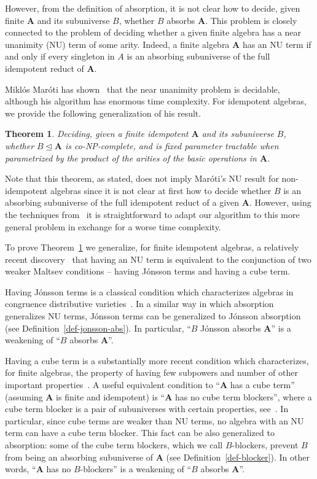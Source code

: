 \documentclass{amsart}
\theoremstyle{plain}
\newtheorem{theorem}{Theorem}
\theoremstyle{definition}
\begin{document}
However, from the definition of absorption, it is not clear how to decide,
given finite ${{\mathbf{A}}}$ and its subuniverse $B$, whether $B$ absorbs ${{\mathbf{A}}}$. This problem is closely connected to the problem of deciding whether a given finite algebra has a near unanimity (NU) term of some arity. Indeed, a finite 
algebra ${{\mathbf{A}}}$ has an NU term if and only if every singleton
in $A$ is an absorbing subuniverse of the full idempotent reduct of ${{\mathbf{A}}}$. 

Mikl\'os Mar\'oti has shown~\cite{maroti-nu-is-decidable} that the near unanimity problem is decidable, although his algorithm has enormous time complexity. 
 For idempotent algebras, we provide the following generalization of his result.
\begin{theorem} \label{thm-deciding-absorption}
Deciding, given a finite idempotent ${{\mathbf{A}}}$ and its subuniverse $B$, whether $B\operatorname{\trianglelefteq} {{\mathbf{A}}}$ is co-{{\textsf{NP}}}-complete, and  is fixed parameter tractable when parametrized by the product of the arities of the basic operations in ${{\mathbf{A}}}$.
\end{theorem}
Note that this theorem, as stated, does not imply Mar\'oti's NU result for non-idempotent algebras since it is not clear at first how to decide whether $B$ is an absorbing subuniverse of the full idempotent reduct of a given ${{\mathbf{A}}}$. 
However, using the techniques from~\cite{zhuk-kazda} it is straightforward to adapt our algorithm to this more general problem in exchange for a worse time complexity. 

To prove Theorem~\ref{thm-deciding-absorption} we generalize, for finite idempotent algebras, a relatively recent discovery~\cite{BIMMVW,MM08b} that having an NU term is equivalent to the conjunction of two weaker Maltsev conditions -- having J\'onsson terms and having a cube term. 

Having J\'onsson terms is a classical condition which characterizes algebras in congruence distributive varieties~\cite{jonsson}. In a similar way in which absorption generalizes NU terms, J\'onsson terms can be generalized to J\'onsson absorption (see Definition~\ref{def-jonsson-abs}). In particular, ``$B$ J\'onsson absorbs ${{\mathbf{A}}}$'' is a weakening of ``$B$ absorbs ${{\mathbf{A}}}$''. 

Having a cube term is a substantially more recent condition which characterizes, for finite algebras, the property of having few subpowers and number of other important properties~\cite{BIMMVW,KS12}. A useful equivalent condition to ``${{\mathbf{A}}}$ has a cube term'' (assuming ${{\mathbf{A}}}$ is finite and idempotent) is ``${{\mathbf{A}}}$ has no cube term blockers'', where a cube term blocker is a pair of subuniverses with certain properties, see~\cite{markovic-maroti-mckenzie-blockers}. In particular, since cube terms are weaker than NU terms, no algebra with an NU term can have a cube term blocker.
This fact can be also generalized to absorption: some of the cube term blockers, which we call $B$-blockers, prevent $B$ from being an absorbing subuniverse of ${{\mathbf{A}}}$ (see Definition~\ref{def-blocker}). In other words, ``${{\mathbf{A}}}$ has no $B$-blockers'' is a weakening of ``$B$ absorbs ${{\mathbf{A}}}$''.
\end{document}
